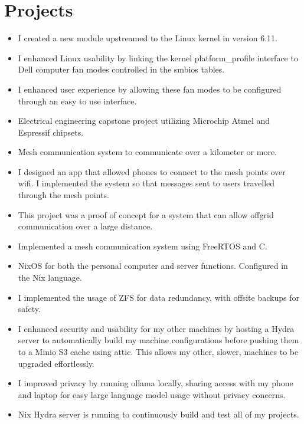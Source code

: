 \documentclass{lsanche_cv}
\begin{document}
\section{Projects}

		\begin{itemize}
			\item I created a new module upstreamed to the Linux kernel in version 6.11.
			\item I enhanced Linux usability by linking the kernel platform\_profile interface to Dell computer fan modes controlled in the smbios tables.
      \item I enhanced user experience by allowing these fan modes to be configured through an easy to use interface.
		\end{itemize}

	\divider

\begin{itemize}
\item Electrical engineering capstone project utilizing Microchip Atmel and Espressif chipsets.
\item Mesh communication system to communicate over a kilometer or more. 
\item I designed an app that allowed phones to connect to the mesh points over wifi. I implemented the system so that messages sent to users travelled through the mesh points.
\item This project was a proof of concept for a system that can allow offgrid communication over a large distance.
\item Implemented a mesh communication system using FreeRTOS and C.
\end{itemize}

\divider

\begin{itemize}
\item NixOS for both the personal computer and server functions. Configured in the Nix language.
\item I implemented the usage of ZFS for data redundancy, with offsite backups for safety.
\item I enhanced security and usability for my other machines by hosting a Hydra server to automatically build my machine configurations before pushing them to a Minio S3 cache using attic. This allows my other, slower, machines to be upgraded effortlessly.
\item I improved privacy by running ollama locally, sharing access with my phone and laptop for easy large language model usage without privacy concerns.
\item Nix Hydra server is running to continuously build and test all of my projects.
\end{itemize}
\end{document}
